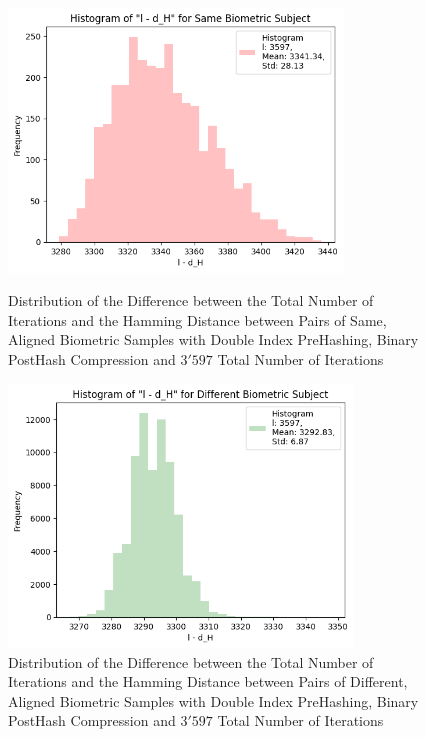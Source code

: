 \begin{enumerate}
\begin{itemize}
            \begin{figure}[H]
                \centering
                \begin{minipage}[b]{0.48\linewidth}
                    \centering
                    \includegraphics[width=\linewidth,height=7cm,keepaspectratio]{latex-img/l-dHconfig3_same_compression.png}
                    \caption{Distribution of the Difference between the Total Number of Iterations and the Hamming Distance between Pairs of Same, Aligned Biometric Samples with Double Index PreHashing, Binary PostHash Compression and $3'597$ Total Number of Iterations}
                    \label{l-dHconfig2_same}
                \end{minipage}
                \hfill
                \begin{minipage}[b]{0.48\linewidth}
                    \centering
                    \includegraphics[width=\linewidth,height=7cm,keepaspectratio]{latex-img/l-dHconfig3_diff_compression.png}
                    \caption{Distribution of the Difference between the Total Number of Iterations and the Hamming Distance between Pairs of Different, Aligned Biometric Samples with Double Index PreHashing, Binary PostHash Compression and $3'597$ Total Number of Iterations}
                    \label{l-dHconfig2_diff}
                \end{minipage}
            \end{figure}


\end{itemize}
\end{enumerate}
